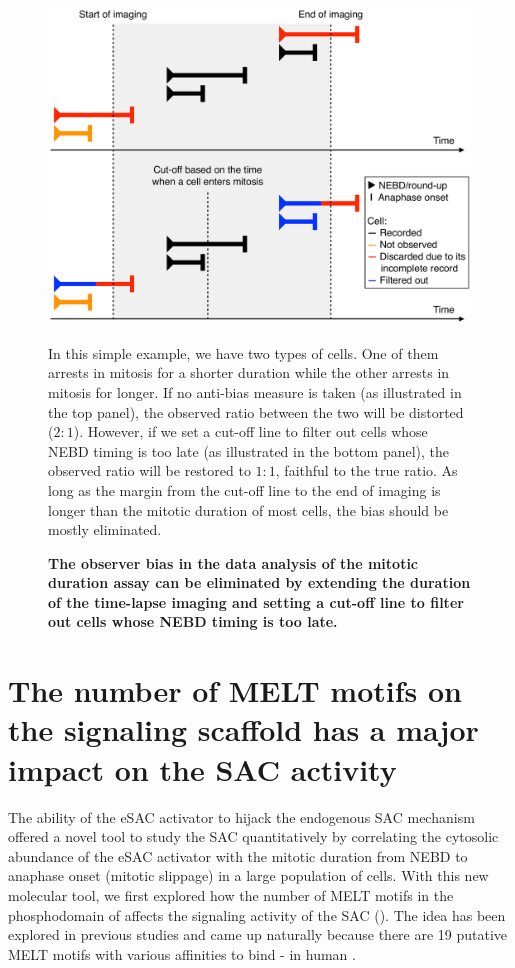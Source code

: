 \begin{figure}
    \centering
    \includegraphics[width=\textwidth]{chapters/figures/CancelIXNAnalysisObserverBias.pdf}
    \caption{\textbf{The observer bias in the data analysis of the mitotic duration assay can be eliminated by extending the duration of the time-lapse imaging and setting a cut-off line to filter out cells whose NEBD timing is too late.}}
    \noindent \justifying In this simple example, we have two types of cells. One of them arrests in mitosis for a shorter duration while the other arrests in mitosis for longer. If no anti-bias measure is taken (as illustrated in the top panel), the observed ratio between the two will be distorted ($2 : 1$). However, if we set a cut-off line to filter out cells whose NEBD timing is too late (as illustrated in the bottom panel), the observed ratio will be restored to $1 : 1$, faithful to the true ratio. As long as the margin from the cut-off line to the end of imaging is longer than the mitotic duration of most cells, the bias should be mostly eliminated.
    \label{CancelIXNAnalysisObserverBias}
\end{figure}

\section{The number of MELT motifs on the  signaling scaffold has a major impact on the SAC activity}

The ability of the eSAC activator to hijack the endogenous SAC mechanism offered a novel tool to study the SAC quantitatively by correlating the cytosolic abundance of the eSAC activator with the mitotic duration from NEBD to anaphase onset (mitotic slippage) in a large population of cells. With this new molecular tool, we first explored how the number of MELT motifs in the phosphodomain of  affects the signaling activity of the SAC (). The idea has been explored in previous studies and came up naturally because there are 19 putative MELT motifs with various affinities to bind - in human  \cite{RecombinantKNL1, MELTActivity}.

